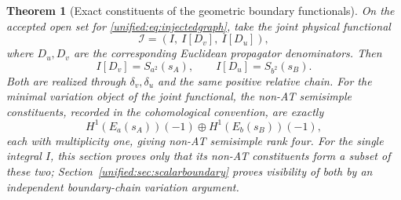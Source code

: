 \documentclass[11pt,a4paper,oneside]{article}
\theoremstyle{plain}
\newtheorem{theorem}{Theorem}[section]
\theoremstyle{definition}
\theoremstyle{remark}
\numberwithin{equation}{section}
\begin{document}
\begin{theorem}[Exact constituents of the geometric boundary functionals]\label{unified:thm:jointsector}
On the accepted open set for \eqref{unified:eq:injectedgraph}, take the joint physical functional
\[
 \mathcal I=(I,\ I[D_v],\ I[D_u]),
\]
where $D_u,D_v$ are the corresponding Euclidean propagator denominators. Then
\begin{equation}\label{unified:eq:cancelledphysical}
 I[D_v]=S_{a^2}(s_A),\qquad I[D_u]=S_{b^2}(s_B).
\end{equation}
Both are realized through $\delta_v,\delta_u$ and the same positive relative chain.
For the minimal variation object of the joint functional, the non-AT semisimple constituents, recorded in the cohomological convention, are exactly
\[
 H^1(E_a(s_A))(-1)\oplus H^1(E_b(s_B))(-1),
\]
each with multiplicity one, giving non-AT semisimple rank four. For the single integral $I$, this section proves only that its non-AT constituents
form a subset of these two; Section~\ref{unified:sec:scalarboundary} proves visibility of both by an independent boundary-chain variation argument.
\end{theorem}
\end{document}
